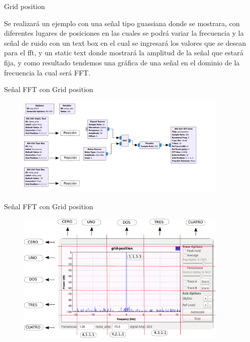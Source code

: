 \begin{frame}{Grid position}

Se realizará un ejemplo con una señal tipo guassiana donde se mostrara, con diferentes lugares de posiciones en las cuales se podrá variar la frecuencia y la señal de ruido con un text box en el cual se ingresará los valores que se desean para el fft, y un static text donde mostrará la amplitud de la señal que estará fija, y como resultado tendemos una gráfica de una señal en el dominio de la frecuencia la cual será FFT.

\end{frame}

\begin{frame}{Señal FFT con Grid position}

\begin{figure}[H]
\centering
\vspace{-3mm}
\includegraphics[width=0.9\textwidth]{parte1/lab3/pdf/lab0_4.pdf}
\end{figure}

\end{frame}
\begin{frame}{Señal FFT con Grid position}

\begin{figure}[H]
\centering
\vspace{-3mm}
\includegraphics[width=0.9\textwidth]{parte1/lab3/pdf/lab0_5.pdf}
\end{figure}

\end{frame}
